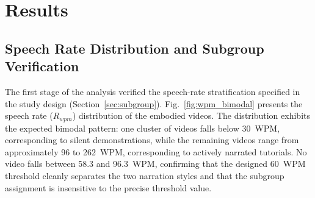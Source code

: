 \section{Results}
\datatable
{}\ytdatatable

\subsection{Speech Rate Distribution and Subgroup Verification}

The first stage of the analysis verified the speech-rate stratification specified in the study design (Section~\ref{sec:subgroup}). Fig.~\ref{fig:wpm_bimodal} presents the speech rate ($R_{wpm}$) distribution of the embodied videos. The distribution exhibits the expected bimodal pattern: one cluster of videos falls below 30~WPM, corresponding to silent demonstrations, while the remaining videos range from approximately 96 to 262~WPM, corresponding to actively narrated tutorials. No video falls between 58.3 and 96.3~WPM, confirming that the designed 60~WPM threshold cleanly separates the two narration styles and that the subgroup assignment is insensitive to the precise threshold value.

